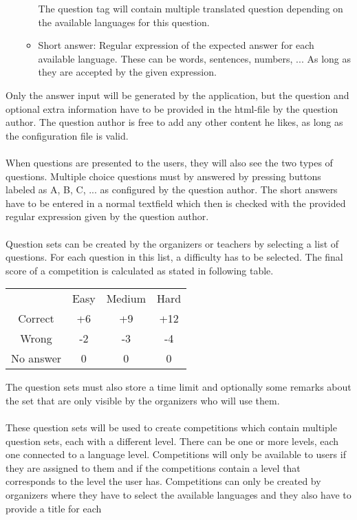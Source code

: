 \begin{section}
\begin{itemize}
\begin{itemize}
  			The question tag will contain multiple translated question depending on the
  			available languages for this question.
  			\item Short answer: Regular expression of the expected answer for each
  			available language. These can be words, sentences, numbers, ... As long as
  			they are accepted by the given expression.
  		\end{itemize}
	\end{itemize}
	Only the answer input will be generated by the application, but the question and
	optional extra information have to be provided in the html-file by the question author.
	The question author is free to add any other content he likes, as long as the
	configuration file is valid. \\
	\\
	When questions are presented to the users, they will also see the two types of
	questions. Multiple choice questions must by answered by pressing buttons labeled as
	A, B, C, ... as configured by the question author. The short answers have to be
	entered in a normal textfield which then is checked with the provided regular
	expression given by the question author.\\
	\\
	Question sets can be created by the organizers or teachers by selecting a list of questions.
	For each question in this list, a difficulty has to be selected. The final score of a
	competition is calculated as stated in following table.
	\begin{tabular}{ c c c c }
	  & Easy & Medium & Hard \\
	  Correct & +6 & +9 & +12 \\
	  Wrong & -2 & -3 & -4 \\
	  No answer & 0 & 0 & 0 \\
	\end{tabular}
	The question sets must also store a time limit and optionally some remarks about the
	set that are only visible by the organizers who will use them. \\
	\\
	These question sets will be used to create competitions which contain multiple
	question sets, each with a different level. There can be one or more levels, each
	one connected to a language level. Competitions will only be available to users if
	they are assigned to them and if the competitions contain a level that corresponds to
	the level the user has. Competitions can only be created by organizers where they have
	to select the available languages and they also have to provide a title for each

\end{section}
